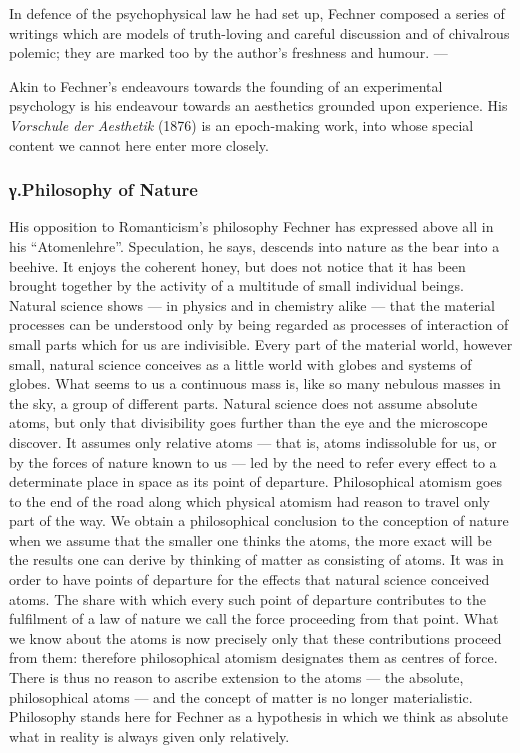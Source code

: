 \documentclass[12pt,a4paper]{book}
\newcommand{\opage}[1]{\marginnote{\footnotesize\textit{[#1]}}}
\begin{document}
In defence of the psychophysical law he had set up, Fechner composed a series of
writings which are models of truth-loving and careful discussion and of
chivalrous polemic; they are marked too by the author's freshness and humour. ---

Akin to Fechner's endeavours towards the founding of an experimental psychology
is his endeavour towards an aesthetics grounded upon experience. His
\textit{Vorschule der Aesthetik} (1876) is an epoch-making work, into whose
special content we cannot here enter more closely.

\subsubsection*{γ.\quad Philosophy of Nature}

\opage{534}His opposition to Romanticism's philosophy Fechner has expressed above all in his
``Atomenlehre''. Speculation, he says, descends into nature as the bear into a
beehive. It enjoys the coherent honey, but does not notice that it has been
brought together by the activity of a multitude of small individual beings.
Natural science shows --- in physics and in chemistry alike --- that the material
processes can be understood only by being regarded as processes of interaction of
small parts which for us are indivisible. Every part of the material world,
however small, natural science conceives as a little world with globes and
systems of globes. What seems to us a continuous mass is, like so many nebulous
masses in the sky, a group of different parts. Natural science does not assume
absolute atoms, but only that divisibility goes further than the eye and the
microscope discover. It assumes only relative atoms --- that is, atoms
indissoluble for us, or by the forces of nature known to us --- led by the need
to refer every effect to a determinate place in space as its point of departure.
Philosophical atomism goes to the end of the road along which physical atomism
had reason to travel only part of the way. We obtain a philosophical conclusion
to the conception of nature when we assume that the smaller one thinks the atoms,
the more exact will be the results one can derive by thinking of matter as
consisting of atoms. It was in order to have points of departure for the effects
that natural science conceived atoms. The share with which every such point of
departure contributes to the fulfilment of a law of nature we call the force
proceeding from that point. What we know about the atoms is now precisely only
that these contributions proceed from them: therefore philosophical atomism
designates them as centres of force. There is thus no reason to ascribe extension
to the atoms --- the absolute, philosophical atoms --- and the concept of matter
is no longer materialistic. Philosophy stands here for Fechner as a hypothesis in
which we think as absolute what in reality is always given only relatively.
\end{document}
